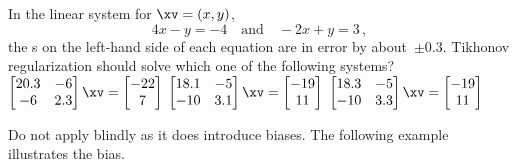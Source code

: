 \begin{activity}
In the linear system for \(\xv=(x,y)\),
\begin{equation*}
4x-y=-4  \quad\text{and}\quad
-2x+y=3\,,
\end{equation*}
the s on the left-hand side of each equation are in error by about~\(\pm0.3\).  
Tikhonov regularization should solve which one of the following systems?
{\(\begin{bmatrix} 20.3&-6\\-6&2.3 \end{bmatrix}\xv=\begin{bmatrix} -22\\7 \end{bmatrix}\)}
{\(\begin{bmatrix} 18.1&-5\\-10&3.1 \end{bmatrix}\xv=\begin{bmatrix} -19\\11 \end{bmatrix}\)}
{\(\begin{bmatrix} 18.3&-5\\-10&3.3 \end{bmatrix}\xv=\begin{bmatrix} -19\\11 \end{bmatrix}\)}
\end{activity}



Do not apply  blindly as it does introduce biases. 
The following example illustrates the bias.

